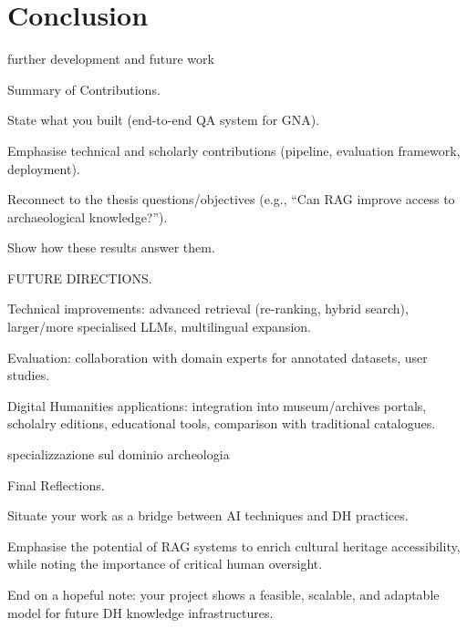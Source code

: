 \chapter{Conclusion}
\label{chap:conclusion}
\begin{spacing}{1.5}

further development and future work

Summary of Contributions.

State what you built (end-to-end QA system for GNA).

Emphasise technical and scholarly contributions (pipeline, evaluation framework, deployment).

Reconnect to the thesis questions/objectives (e.g., “Can RAG improve access to archaeological knowledge?”).

Show how these results answer them.

FUTURE DIRECTIONS.

Technical improvements: advanced retrieval (re-ranking, hybrid search), larger/more specialised LLMs, multilingual expansion.

Evaluation: collaboration with domain experts for annotated datasets, user studies.

Digital Humanities applications: integration into museum/archives portals, scholalry editions, educational tools, comparison with traditional catalogues.

specializzazione sul dominio archeologia

Final Reflections.

Situate your work as a bridge between AI techniques and DH practices.

Emphasise the potential of RAG systems to enrich cultural heritage accessibility, while noting the importance of critical human oversight.

End on a hopeful note: your project shows a feasible, scalable, and adaptable model for future DH knowledge infrastructures.


\end{spacing}